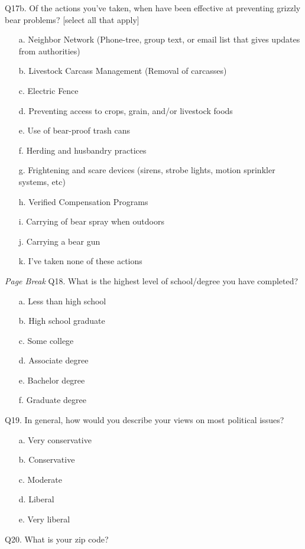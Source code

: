 \documentclass[english,12pt]{article}
\begin{document}
Q17b. Of the actions you've taken, when have been effective at preventing grizzly bear problems? [select all that apply]
\begin{enumerate}
    \item[a.] Neighbor Network (Phone-tree, group text, or email list that gives updates from authorities)
    \item[b.] Livestock Carcass Management (Removal of carcasses)
    \item[c.] Electric Fence
    \item[d.] Preventing access to crops, grain, and/or livestock foods
    \item[e.] Use of bear-proof trash cans
    \item[f.] Herding and husbandry practices
    \item[g.] Frightening and scare devices (sirens, strobe lights, motion sprinkler systems, etc)
    \item[h.] Verified Compensation Programs
    \item[i.] Carrying of bear spray when outdoors
    \item[j.] Carrying a bear gun
    \item[k.] I've taken none of these actions
\end{enumerate}
\textit{Page Break}
\newpage
Q18. What is the highest level of school/degree you have completed?
\begin{enumerate}
    \item[a.] Less than high school
    \item[b.] High school graduate
    \item[c.] Some college
    \item[d.] Associate degree
    \item[e.] Bachelor degree
    \item[f.] Graduate degree
\end{enumerate}

Q19. In general, how would you describe your views on most political issues?
\begin{enumerate}
    \item[a.] Very conservative
    \item[b.] Conservative
    \item[c.] Moderate
    \item[d.] Liberal
    \item[e.] Very liberal
\end{enumerate}

Q20. What is your zip code?
\end{document}
